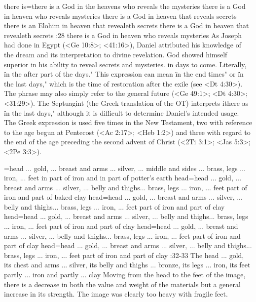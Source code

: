     {there is}={there is a God in the heavens who reveals the mysteries} %
    {there is a God in heaven who reveals mysteries} %
    {there is a God in heaven that reveals secrets} %
    {there is an Elohim in heaven that revealeth secrets} %
    {there is a God in heaven that revealeth secrets} %
:28 {there is a God in heaven who reveals mysteries} As Joseph had done in Egypt
(<Ge 10:8>; <41:16>), %
Daniel attributed his  
knowledge of the dream and its interpretation to divine revelation. 
God showed himself superior in his ability to reveal secrets and 
mysteries. in days to come. Literally, \"in the after part of the days." 
This expression can mean \"in the end times" or \"in the last days,"
which is the time of restoration after the exile (see <Dt 4:30>). The 
phrase may also simply refer to the general future (<Ge 49:1>; <Dt 4:30>; 
<31:29>). The Septuagint (the Greek translation of the OT) interprets 
ithere as \"in the last days," although it is difficult to determine Daniel's intended usage. The
Greek expression is used five times in the  
New Testament, two with reference to the age begun at Pentecost 
(<Ac 2:17>; <Heb 1:2>) and three with regard to the end of the age preceding the second advent of Christ
(<2Ti 3:1>; <Jas 5:3>; <2Pe 3:3>).

={head ... gold, ... breast and arms ... silver, ... middle and sides ... brass, legs ... iron, ... feet in part of iron and in part of potter's earth} %
    {head}={head ... gold, ... breast and arms ... silver, ... belly and thighs... brass, legs ... iron, ... feet  part of iron and part of baked clay} %
    {head}={head ... gold, ... breast and arms ... silver, ... belly and thighs... brass, legs ... iron, ... feet  part of iron and part of clay} %
    {head}={head ... gold, ... breast and arms ... silver, ... belly and thighs... brass, legs ... iron, ... feet  part of iron and part of clay} %
    {head}={head ... gold, ... breast and arms ... silver, ... belly and thighs... brass, legs ... iron, ... feet  part of iron and part of clay} %
    {head}={head ... gold, ... breast and arms ... silver, ... belly and thighs... brass, legs ... iron, ... feet  part of iron and part of clay} %
:32-33 {The head ... gold, its chest and arms ... silver, its 
belly and thighs ... bronze, its legs ... iron, its feet partly ... 
iron and partly ... clay} Moving from the head to the feet of the 
image, there is a decrease in both the value and weight of the materials but a general increase in
its strength. The image was clearly  too heavy with fragile feet.


